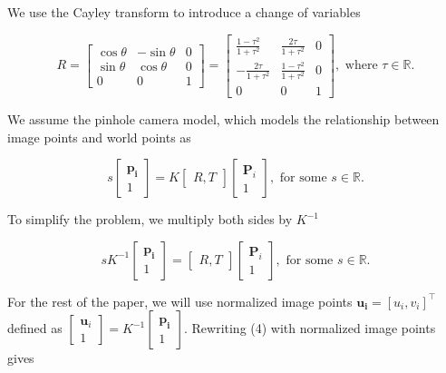 \documentclass[12pt]{article}
\begin{document}
We use the Cayley transform to introduce a change of variables

\begin{equation}
R=\begin{bmatrix}
  \cos \theta & -\sin\theta & 0\\
  \sin \theta & \cos \theta & 0\\
  0 & 0 & 1
\end{bmatrix}=\begin{bmatrix}
  \frac{1-\tau^2}{1+\tau^2} & \frac{2\tau}{1+\tau^2} & 0\\
  -\frac{2\tau}{1+\tau^2} & \frac{1-\tau^2}{1+\tau^2} & 0\\
  0 & 0 & 1
\end{bmatrix},\text{ where }\tau\in\mathbb{R}.
\end{equation}

We assume the pinhole camera model, which models the relationship between image points and world points as

\begin{equation}
  s\begin{bmatrix}
    \mathbf{p_i}\\ 1
  \end{bmatrix}=K\begin{bmatrix}
    R, T
  \end{bmatrix}\begin{bmatrix}
    \mathbf{P}_i\\ 1
  \end{bmatrix}, \text{ for some }s\in\mathbb{R}.
\end{equation}

To simplify the problem, we multiply both sides by $K^{-1}$

\begin{equation}
  sK^{-1}\begin{bmatrix}
    \mathbf{p_i}\\ 1
  \end{bmatrix}=\begin{bmatrix}
    R, T
  \end{bmatrix}\begin{bmatrix}
    \mathbf{P}_i\\ 1
  \end{bmatrix}, \text{ for some }s\in\mathbb{R}.
\end{equation}

For the rest of the paper, we will use normalized image points $\mathbf{u_i}=[u_i,v_i]^\intercal$ defined as $\begin{bmatrix}
  \mathbf{u}_i \\ 1
\end{bmatrix}=K^{-1}\begin{bmatrix}
  \mathbf{p_i} \\ 1
\end{bmatrix}$. Rewriting (4) with normalized image points gives
\end{document}
